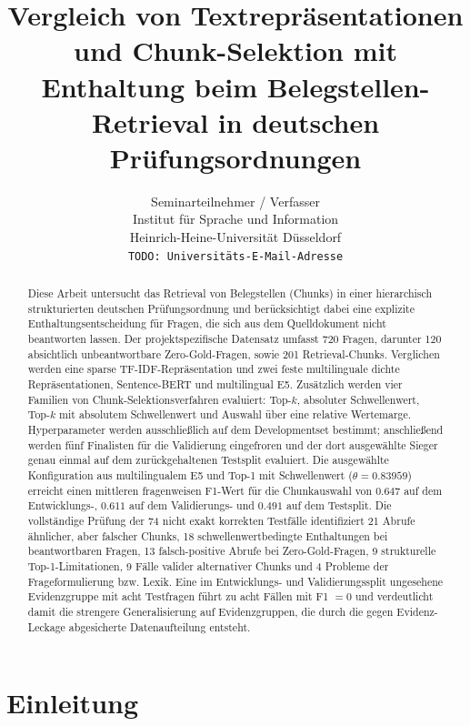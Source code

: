 \documentclass[11pt]{article}
\title{Vergleich von Textrepräsentationen und Chunk-Selektion mit Enthaltung beim Belegstellen-Retrieval in deutschen Prüfungsordnungen}
\author{Seminarteilnehmer / Verfasser \\
  Institut f\"ur Sprache und Information \\
  Heinrich-Heine-Universit\"at D\"usseldorf \\
  \texttt{TODO: Universitäts-E-Mail-Adresse}}
\begin{document}
\maketitle

\begin{abstract}
Diese Arbeit untersucht das Retrieval von Belegstellen (Chunks) in einer hierarchisch strukturierten deutschen Prüfungsordnung und berücksichtigt dabei eine explizite Enthaltungsentscheidung für Fragen, die sich aus dem Quelldokument nicht beantworten lassen. Der projektspezifische Datensatz umfasst 720 Fragen, darunter 120 absichtlich unbeantwortbare Zero-Gold-Fragen, sowie 201 Retrieval-Chunks. Verglichen werden eine sparse TF-IDF-Repräsentation und zwei feste multilinguale dichte Repräsentationen, Sentence-BERT und multilingual E5. Zusätzlich werden vier Familien von Chunk-Selektionsverfahren evaluiert: Top-$k$, absoluter Schwellenwert, Top-$k$ mit absolutem Schwellenwert und Auswahl über eine relative Wertemarge. Hyperparameter werden ausschließlich auf dem Developmentset bestimmt; anschließend werden fünf Finalisten für die Validierung eingefroren und der dort ausgewählte Sieger genau einmal auf dem zurückgehaltenen Testsplit evaluiert. Die ausgewählte Konfiguration aus multilingualem E5 und Top-1 mit Schwellenwert ($\theta=0.83959$) erreicht einen mittleren fragenweisen F1-Wert für die Chunkauswahl von $0.647$ auf dem Entwicklungs-, $0.611$ auf dem Validierungs- und $0.491$ auf dem Testsplit. Die vollständige Prüfung der 74 nicht exakt korrekten Testfälle identifiziert 21 Abrufe ähnlicher, aber falscher Chunks, 18 schwellenwertbedingte Enthaltungen bei beantwortbaren Fragen, 13 falsch-positive Abrufe bei Zero-Gold-Fragen, 9 strukturelle Top-1-Limitationen, 9 Fälle valider alternativer Chunks und 4 Probleme der Frageformulierung bzw. Lexik. Eine im Entwicklungs- und Validierungssplit ungesehene Evidenzgruppe mit acht Testfragen führt zu acht Fällen mit F1 $=0$ und verdeutlicht damit die strengere Generalisierung auf Evidenzgruppen, die durch die gegen Evidenz-Leckage abgesicherte Datenaufteilung entsteht.
\end{abstract}


\section{Einleitung}
\end{document}
